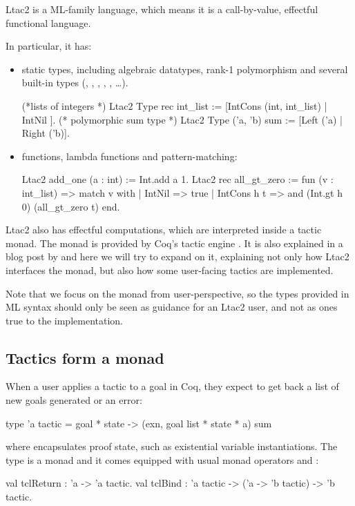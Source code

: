 Ltac2 is a ML-family language, which means it is a call-by-value, effectful functional language.

In particular, it has:
\begin{itemize}
\item static types, including algebraic datatypes, rank-1 polymorphism and several built-in types (, , , , , \ldots).
  \begin{coq}
  (*lists of integers *)
  Ltac2 Type rec int_list := [IntCons (int, int_list) | IntNil ].
  (* polymorphic sum type *)
  Ltac2 Type ('a, 'b) sum := [Left ('a) | Right ('b)].
  \end{coq}
\item functions, lambda functions and pattern-matching:
  \begin{coq}
  Ltac2 add_one (a : int) := Int.add a 1.
  Ltac2 rec all_gt_zero := fun (v : int_list) =>
    match v with
    | IntNil => true
    | IntCons h t => and (Int.gt h 0) (all_gt_zero t)
    end.
  \end{coq}
\end{itemize}

Ltac2 also has effectful computations, which are interpreted inside a tactic monad.
The monad is provided by Coq's tactic engine \cite{spiwackAbstractTypeConstructing2010}.
It is also explained in a blog post by \citet{pedrotCoqHoTTminuteTickingClockwork2016} and here we will try to expand on it, explaining not only how Ltac2 interfaces the monad, but also how some user-facing tactics are implemented.

Note that we focus on the monad from user-perspective, so the types provided in ML syntax should only be seen as guidance for an Ltac2 user, and not as ones true to the implementation.

\subsection{Tactics form a monad}
\label{sec:monad-tactics}

When a user applies a tactic to a goal in Coq, they expect to get back a list of new goals generated or an error:
\begin{ocaml}
type 'a tactic = goal * state -> (exn, goal list * state * a) sum
\end{ocaml}
where  encapsulates proof state, such as existential variable instantiations.
The  type is a monad and it comes equipped with usual monad operators  and :
\begin{ocaml}
val tclReturn : 'a -> 'a tactic.
val tclBind : 'a tactic -> ('a -> 'b tactic) -> 'b tactic.
\end{ocaml}

